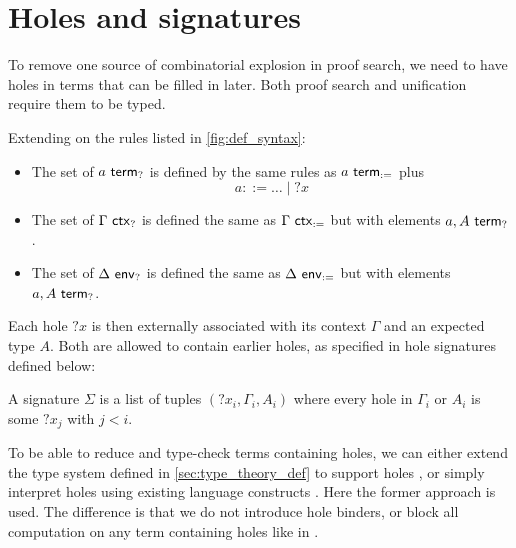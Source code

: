 \documentclass[twoside]{report}
\begin{document}
\section{Holes and signatures}
\label{sec:holes_and_signatures}

To remove one source of combinatorial explosion in proof search, we need to have holes in terms that can be filled in later. Both proof search and unification require them to be typed.

\begin{definition}[Syntax]
\label{def:hole_syntax}
Extending on the rules listed in \cref{fig:def_syntax}:
\begin{itemize}[noitemsep]
    \item The set of $a \ \mathsf{term}_{?}$ is defined by the same rules as $a \ \mathsf{term}_{:=}$ plus
    $$
    a ::= {} \ldots \mid {?x}
    $$
    \item The set of $\Gamma \ \mathsf{ctx}_{?}$ is defined the same as $\Gamma \ \mathsf{ctx}_{:=}$ but with elements $a, A \ \mathsf{term}_{?}$.
    \item The set of $\Delta \ \mathsf{env}_{?}$ is defined the same as $\Delta \ \mathsf{env}_{:=}$ but with elements $a, A \ \mathsf{term}_{?}$.
\end{itemize}
\end{definition}

Each hole ${?x}$ is then externally associated with its context $\Gamma$ and an expected type $A$. Both are allowed to contain earlier holes, as specified in hole signatures defined below:

\begin{definition}[Signatures]
\label{def:hole_signatures}
A signature $\Sigma$ is a list of tuples $({?x_i}, \Gamma_i, A_i)$ where every hole in $\Gamma_i$ or $A_i$ is some $?x_j$ with $j < i$.
\end{definition}

To be able to reduce and type-check terms containing holes, we can either extend the type system defined in \cref{sec:type_theory_def} to support holes \cite{mcbride2000dependently}, or simply interpret holes using existing language constructs \cite{norell2007towards}. Here the former approach is used. The difference is that we do not introduce hole binders, or block all computation on any term containing holes like in \cite{mcbride2000dependently}. %
\end{document}
